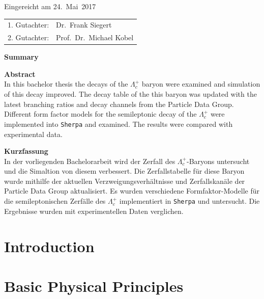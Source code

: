 \thispagestyle{empty}\vspace*{48em}

Eingereicht am 24.~Mai~2017\vspace{1.5em}
\par{\large\begin{tabular}{ll}
 1. Gutachter: & Dr.~Frank Siegert \\
 2. Gutachter: & Prof.~Dr.~Michael Kobel \\
\end{tabular}}


\newpage
\begin{center}\large\bfseries Summary\end{center}


\textbf{Abstract} \\
In this bachelor thesis the decays of the \(\Lambda_c^+\) baryon were examined 
and simulation of this decay improved. The decay table of the this baryon 
was updated with the latest  branching ratios and decay channels from the 
Particle Data Group. Different form factor models for the semileptonic decay 
of the \(\Lambda_c^+\) were implemented into \texttt{Sherpa} and examined.
The results were compared with experimental data. 


\vspace{20em}
\textbf{Kurzfassung} \\ 
In der vorliegenden Bachelorarbeit wird der Zerfall des \(\Lambda_c^+\)-Baryons 
untersucht und die Simaltion von diesem verbessert. Die Zerfallstabelle 
f{\"u}r diese Baryon wurde mithilfe der aktuellen 
Verzweigungsverh{\"a}ltnisse und Zerfallskan{\"a}le der Particle Data Group 
aktualisiert. Es wurden verschiedene Formfaktor-Modelle f{\"u}r die 
semileptonischen Zerf{\"a}lle des \(\Lambda_c^+\) implementiert in \texttt{Sherpa}
und untersucht. Die Ergebnisse wurden mit experimentellen Daten verglichen. 

 
 

\tableofcontents




\chapter{Introduction}

\chapter{Basic Physical Principles}


